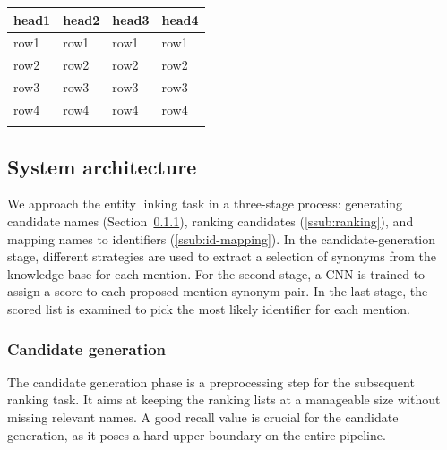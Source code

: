 \documentclass{bioinfo}
\begin{document}
\begin{table}[!t]
{\begin{tabular}{@{}llll@{}}\toprule
head1 & head2 & head3 & head4\\\midrule
row1 & row1 & row1 & row1\\
row2 & row2 & row2 & row2\\
row3 & row3 & row3 & row3\\
row4 & row4 & row4 & row4\\\botrule
\end{tabular}}{}
\end{table}



\subsection{System architecture}

We approach the entity linking task in a three-stage process:
generating candidate names (Section~\ref{ssub:cand-gen}),
ranking candidates (\ref{ssub:ranking}), and
mapping names to identifiers (\ref{ssub:id-mapping}).
In the candidate-generation stage, different strategies are used to extract a selection of synonyms from the knowledge base for each mention.
For the second stage, a CNN is trained to assign a score to each proposed mention-synonym pair.
In the last stage, the scored list is examined to pick the most likely identifier for each mention.

\subsubsection{Candidate generation}
\label{ssub:cand-gen}

The candidate generation phase is a preprocessing step for the subsequent ranking task.
It aims at keeping the ranking lists at a manageable size without missing relevant names.
A good recall value is crucial for the candidate generation, as it poses a hard upper boundary on the entire pipeline.
\end{document}
